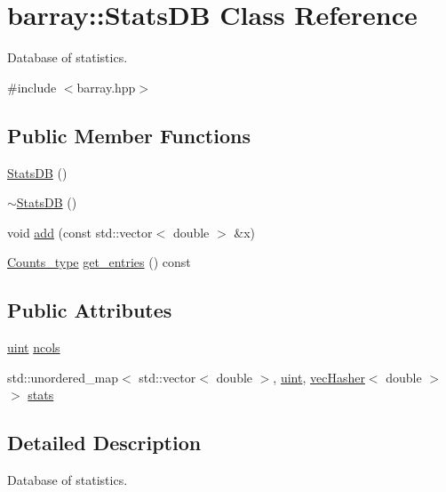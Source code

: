 \hypertarget{classbarray_1_1_stats_d_b}{}\section{barray\+:\+:Stats\+DB Class Reference}
\label{classbarray_1_1_stats_d_b}


Database of statistics.  




{\ttfamily \#include $<$barray.\+hpp$>$}

\subsection*{Public Member Functions}
\begin{DoxyCompactItemize}
\item 
\hyperlink{classbarray_1_1_stats_d_b_ae340e221cf709c0163a67436eb6e49dd}{Stats\+DB} ()
\item 
\hyperlink{classbarray_1_1_stats_d_b_a111c72722a94fbb45e6c4d495081fa7e}{$\sim$\+Stats\+DB} ()
\item 
void \hyperlink{classbarray_1_1_stats_d_b_a196bdb1b0a8e166d03a90aadc0e103b0}{add} (const std\+::vector$<$ double $>$ \&x)
\item 
\hyperlink{namespacebarray_a402b1982cc07118fb03b259b3fbe6b13}{Counts\+\_\+type} \hyperlink{classbarray_1_1_stats_d_b_ab1a4d57ee2be6d87d9b4acfb794dd768}{get\+\_\+entries} () const
\end{DoxyCompactItemize}
\subsection*{Public Attributes}
\begin{DoxyCompactItemize}
\item 
\hyperlink{namespacebarray_af9756a31953db233f80a9cfe1ef31c32}{uint} \hyperlink{classbarray_1_1_stats_d_b_a719cd8317c2b59c38cc5b09277ab0bc2}{ncols}
\item 
std\+::unordered\+\_\+map$<$ std\+::vector$<$ double $>$, \hyperlink{namespacebarray_af9756a31953db233f80a9cfe1ef31c32}{uint}, \hyperlink{structbarray_1_1vec_hasher}{vec\+Hasher}$<$ double $>$ $>$ \hyperlink{classbarray_1_1_stats_d_b_abdf3bb2c4b597f1d356cf5a3609b7211}{stats}
\end{DoxyCompactItemize}


\subsection{Detailed Description}
Database of statistics. 

